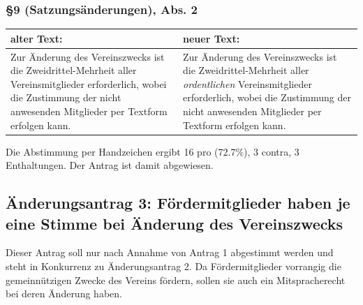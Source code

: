 \documentclass[a4paper,12pt]{scrartcl}
\begin{document}
\subsubsection*{§9 (Satzungsänderungen), Abs. 2}
\begin{longtable}[c]{@{}ll@{}}
\toprule
\begin{minipage}[b]{0.47\columnwidth}\raggedright\strut
alter Text:
\strut\end{minipage} &
\begin{minipage}[b]{0.47\columnwidth}\raggedright\strut
neuer Text:
\strut\end{minipage}\tabularnewline
\midrule
\endhead
\begin{minipage}[t]{0.47\columnwidth}\raggedright\strut
Zur Änderung des Vereinszwecks ist die Zweidrittel-Mehrheit aller
Vereinsmitglieder erforderlich, wobei die Zustimmung der nicht
anwesenden Mitglieder per Textform erfolgen kann.
\strut\end{minipage} &
\begin{minipage}[t]{0.47\columnwidth}\raggedright\strut
Zur Änderung des Vereinszwecks ist die Zweidrittel-Mehrheit aller
\emph{ordentlichen} Vereinsmitglieder erforderlich, wobei die Zustimmung der
nicht anwesenden Mitglieder per Textform erfolgen kann.
\strut\end{minipage}\tabularnewline
\bottomrule
\end{longtable}

 Die Abstimmung per Handzeichen ergibt 16 pro (72.7\%), 3
contra, 3 Enthaltungen. Der Antrag ist damit abgewiesen.


\subsection{Änderungsantrag 3: Fördermitglieder haben je eine Stimme bei
Änderung des Vereinszwecks}
Dieser Antrag soll nur nach Annahme von Antrag 1 abgestimmt werden und
steht in Konkurrenz zu Änderungsantrag 2. Da Fördermitglieder vorrangig
die gemeinnützigen Zwecke des Vereins fördern, sollen sie auch ein
Mitspracherecht bei deren Änderung haben.

\newpage
\end{document}
